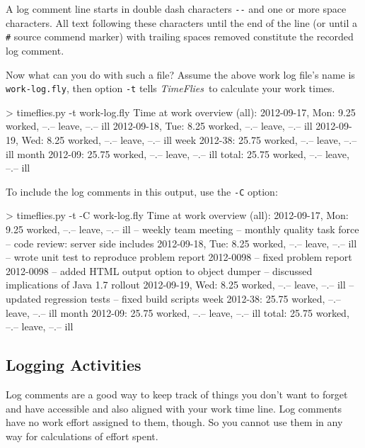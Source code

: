 \documentclass[11pt]{article}
\newcommand{\timeflies}{\emph{TimeFlies}}
\begin{document}
A log comment line starts in double dash characters \verb=--= and one or more space characters. All text following these characters until the end of the line (or until a \verb-#- source commend marker) with trailing spaces removed constitute the recorded log comment.

Now what can you do with such a file? Assume the above work log file's name is \verb:work-log.fly:, then option \verb:-t: tells \timeflies\ to calculate your work times.

\begin{inputfile}
> timeflies.py -t work-log.fly 
Time at work overview (all):
2012-09-17, Mon:  9.25 worked, --.-- leave, --.-- ill
2012-09-18, Tue:  8.25 worked, --.-- leave, --.-- ill
2012-09-19, Wed:  8.25 worked, --.-- leave, --.-- ill
   week 2012-38: 25.75 worked, --.-- leave, --.-- ill
  month 2012-09: 25.75 worked, --.-- leave, --.-- ill
          total: 25.75 worked, --.-- leave, --.-- ill
\end{inputfile}

To include the log comments in this output, use the \verb=-C= option:

\begin{inputfile}
> timeflies.py -t -C work-log.fly 
Time at work overview (all):
2012-09-17, Mon:  9.25 worked, --.-- leave, --.-- ill
             -- weekly team meeting
             -- monthly quality task force
             -- code review: server side includes
2012-09-18, Tue:  8.25 worked, --.-- leave, --.-- ill
             -- wrote unit test to reproduce problem report 2012-0098
             -- fixed problem report 2012-0098
             -- added HTML output option to object dumper
             -- discussed implications of Java 1.7 rollout
2012-09-19, Wed:  8.25 worked, --.-- leave, --.-- ill
             -- updated regression tests
             -- fixed build scripts
   week 2012-38: 25.75 worked, --.-- leave, --.-- ill
  month 2012-09: 25.75 worked, --.-- leave, --.-- ill
          total: 25.75 worked, --.-- leave, --.-- ill
\end{inputfile}

\subsection{Logging Activities}

Log comments are a good way to keep track of things you don't want to forget and have accessible and also aligned with your work time line. Log comments have no work effort assigned to them, though. So you cannot use them in any way for calculations of effort spent.
\end{document}
